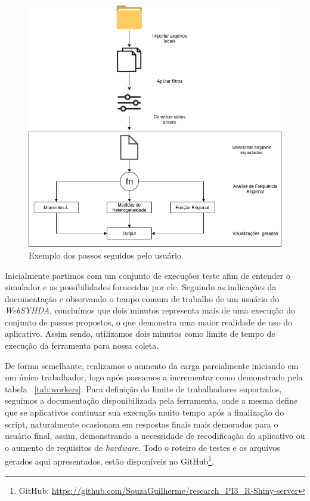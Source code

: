 \documentclass[12pt,english,brazil]{article}
\begin{document}
\begin{figure}[htbp]
  \centering 
  \includegraphics[scale=.4]{paperWSCAD2021/figures/useWebSYHDADrawio.png}
  \caption{Exemplo dos passos seguidos pelo usuário}
  \label{usoWebSYHDA}
\end{figure}

Inicialmente partimos com um conjunto de execuções teste afim de entender o simulador e as possibilidades fornecidas por ele. Seguindo as indicações da documentação e observando o tempo comum de trabalho de um usuário do \emph{WebSYHDA}, concluímos que %
dois minutos representa mais de uma execução do conjunto de passos propostos, o que demonstra uma maior realidade de uso do aplicativo. Assim sendo, utilizamos dois minutos como limite de tempo de execução da ferramenta para nossa coleta.




De forma semelhante, realizamos o aumento da carga parcialmente iniciando em um único trabalhador, logo após passamos a incrementar como demonstrado pela tabela ~\ref{tab:workers}. Para definição do limite de trabalhadores suportados, seguimos a documentação disponibilizada pela ferramenta, onde a mesma define que se aplicativos continuar sua execução muito tempo após a finalização do script, naturalmente ocasionam em respostas finais mais demoradas para o usuário final, assim, demonstrando a necessidade de recodificação do aplicativo ou o aumento de requisitos de \emph{hardware}. Todo o roteiro de testes e os arquivos gerados aqui apresentados, estão disponíveis no GitHub\footnote{GitHub: \url{https://github.com/SouzaGuilherme/research_PI3_R-Shiny-server}}.
\end{document}
